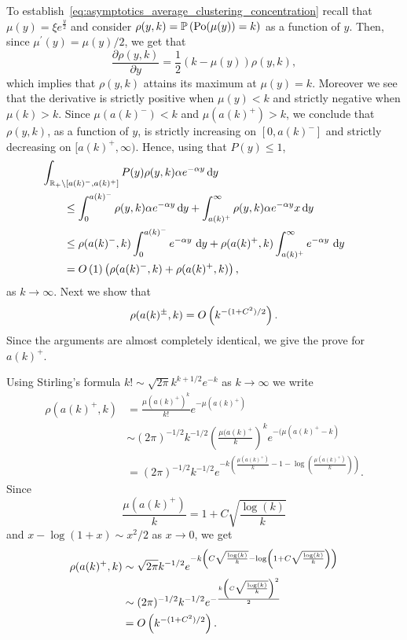 To establish~\eqref{eq:asymptotics_average_clustering_concentration} recall that $\mu(y) = \xi e^{\frac{y}{2}}$ and consider $\rho(y,k) = \mathbb{P}\left({\mathrm{Po}}(\mu(y)) = k\right)$ as a function of $y$. Then, since $\mu^\prime(y) = \mu(y)/2$, we get that
\[
	\frac{\partial \rho(y,k)}{\partial y} = \frac{1}{2}\left(k - \mu(y)\right)\rho(y,k),
\]
which implies that $\rho(y,k)$ attains its maximum at $\mu(y) = k$. Moreover we see that the derivative is strictly positive when $\mu(y) < k$ and strictly negative when $\mu(k) > k$. Since $\mu(a(k)^-) < k$ and $\mu(a(k)^+) > k$, we conclude that $\rho(y,k)$, as a function of $y$, is strictly increasing on $[0,a(k)^-]$ and strictly decreasing on $[a(k)^+,\infty)$. Hence, using that $P(y) \le 1$,
\begin{align*}
	&\hspace{-20pt}\int_{\R_+ \setminus [a(k)^-, a(k)^+]} P(y) \rho(y,k) 
		\alpha e^{-\alpha y} \dd y\\
    &\le \int_0^{a(k)^-} \rho(y,k) \alpha e^{-\alpha y} \dd y 
    	+ \int_{a(k)^+}^{\infty}\rho(y,k) \alpha e^{-\alpha y}x \dd y \\
   	&\le \rho(a(k)^-,k)\int_0^{a(k)^-} e^{-\alpha y} \, \dd y
   		+ \rho(a(k)^+,k) \int_{a(k)^+}^{\infty} e^{-\alpha y} \, \dd y\\
   	&= \bigO{1}\left(\rho(a(k)^-,k) + \rho(a(k)^+,k)\right),
\end{align*}
as $k \to \infty$. Next we show that
\[
	\rho(a(k)^\pm,k) = O\left(k^{-(1+C^2)/2}\right).
\]
Since the arguments are almost completely identical, we give the prove for $a(k)^+$.

Using Stirling's formula $k! \sim \sqrt{2\pi} k^{k + 1/2} e^{-k}$ as $k \to \infty$ we write
\begin{align*}
	\rho(a(k)^+,k) &= \frac{\mu(a(k)^+)^{k}}{k!} e^{-\mu(a(k)^+)} \\
	&\sim (2\pi)^{-1/2} k^{-1/2} \left(\frac{\mu(a(k)^+}{k}\right)^{k} e^{-(\mu(a(k)^+ - k)}\\
	&= (2\pi)^{-1/2} k^{-1/2} 
		e^{-k\left(\frac{\mu(a(k)^+)}{k} - 1 - \log\left(\frac{\mu(a(k)^+)}{k}\right)\right)}.
\end{align*}
Since 
\[
	\frac{\mu(a(k)^+)}{k} = 1 + C \sqrt{\frac{\log(k)}{k}}
\]
and $x - \log(1 + x) \sim x^2/2$ as $x \to 0$, we get 
\begin{align*}
	\rho(a(k)^+,k) 
	&\sim \sqrt{2\pi} k^{-1/2} 
		e^{-k \left(C \sqrt{\frac{\log(k)}{k}} - \log\left(1 + C \sqrt{\frac{\log(k)}{k}}\right)\right)}\\
	&\sim (2\pi)^{-1/2} k^{-1/2} e^{-\frac{k \left(C \sqrt{\frac{\log(k)}{k}}\right)^2}{2}} \\
	&= O\left(k^{-(1+C^2)/2}\right).
\end{align*}

